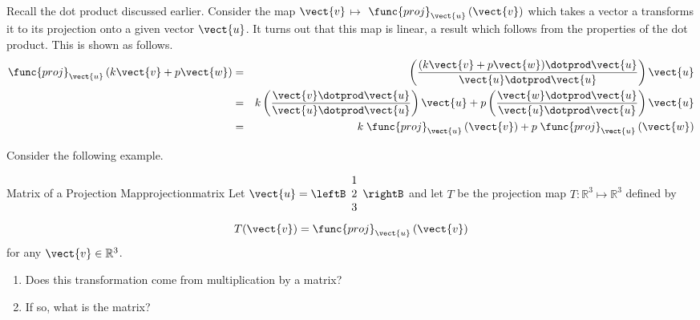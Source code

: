 Recall the dot product discussed earlier. Consider the map $\vect{v}$\textbf{$\mapsto $}
$\func{proj}_{\vect{u}}\left( \vect{v}\right) $ which takes a vector a transforms it to its projection onto a given vector $\vect{u}$. It turns out that
this map is linear, a result which follows from the properties of the
dot product. This is shown as follows.
\begin{eqnarray*}
\func{proj}_{\vect{u}}\left( k \vect{v}+ p \vect{w}\right)
&=&\left( \vspace{0.05in}\frac{(k \vect{v}+ p \vect{w})\dotprod \vect{u}}{
\vect{u}\dotprod \vect{u}}\right) \vect{u} \\
&=& k  \left( \vspace{0.05in}\frac{
\vect{v}\dotprod \vect{u}}{\vect{u}\dotprod \vect{u}}\right) \vect{u}+p \left( \vspace{
0.05in}\frac{\vect{w}\dotprod \vect{u}}{\vect{u}\dotprod \vect{u}}\right) \vect{u} \\
&=& k \; \func{proj}_{\vect{u}}\left( \vect{v}\right) +p \; \func{proj}
_{\vect{u}}\left( \vect{w}\right) 
\end{eqnarray*}

Consider the following example.

\begin{example}{Matrix of a Projection Map}{projectionmatrix}
Let $\vect{u} = \leftB \begin{array}{r}
1 \\
2 \\
3
\end{array}
\rightB$ and let $T$ be the projection map $T: \mathbb{R}^3 \mapsto \mathbb{R}^3$ defined by 
\[
T(\vect{v}) = \func{proj}_{\vect{u}}\left( \vect{v}\right)
\]
for any $\vect{v} \in \mathbb{R}^3$.  
\begin{enumerate}
\item Does this transformation come from
multiplication by a matrix?
\item If so, what is the matrix?
\end{enumerate}
\end{example}

